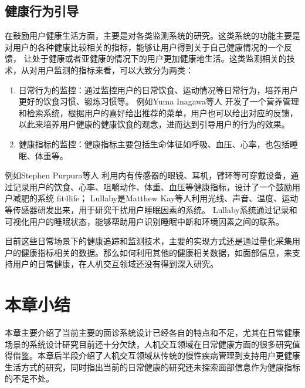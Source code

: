 \subsection{健康行为引导}
在鼓励用户健康生活方面，主要是对各类监测系统的研究。这类系统的功能主要是对用户的各种健康比较相关的指标，能够让用户得到关于自己健康情况的一个反馈，
让处于健康或者亚健康的情况下的用户更加健康地生活。这类监测相关的技术，从对用户监测的指标来看，可以大致分为两类：
\begin{enumerate}

    \item 日常行为的监控：通过监控用户的日常饮食、运动情况等日常行为，培养用户更好的饮食习惯、锻炼习惯等\cite{purpura2011fit4life, Inagawa2013A,bravata2007using,cordeiro2015barriers,lin2006fish, miller2014stepstream}。 例如Yuma Inagawa等人\cite{Inagawa2013A} 开发了一个营养管理和检索系统，根据用户的喜好给出推荐的菜单，用户也可以给出对应的反馈，以此来培养用户健康的健康饮食的观念，进而达到引导用户的行为的效果。

    \item 健康指标的监控：健康指标主要包括生命体征如呼吸、血压、心率，也包括睡眠、体重等\cite{kay2012lullaby, gronvall2013beyond}。
    
\end{enumerate}

例如Stephen Purpura等人\cite{purpura2011fit4life} 利用内有传感器的眼镜、耳机，臂环等可穿戴设备，通过记录用户的饮食、心率、咀嚼动作、体重、血压等健康指标，设计了一个鼓励用户减肥的系统 fit4life； 
Lullaby\cite{kay2012lullaby}是Matthew Kay等人利用光线、声音、温度、运动等传感器研发出来，用于研究干扰用户睡眠因素的系统。
Lullaby系统通过记录和可视化用户的睡眠状态，能够帮助用户识别睡眠中断和环境因素之间的联系。 


目前这些日常场景下的健康追踪和监测技术，主要的实现方式还是通过量化采集用户的健康指标相关的数据。那么如何利用其他的健康相关数据，如面部信息，来支持用户的日常健康，在人机交互领域还没有得到深入研究。



\section{本章小结}
本章主要介绍了当前主要的面诊系统设计已经各自的特点和不足，尤其在日常健康场景的系统设计研究目前还十分欠缺，人机交互领域在日常健康方面的很多研究值得借鉴。本章后半段介绍了人机交互领域从传统的慢性疾病管理到支持用户更健康生活方式的研究，同时指出当前的日常健康的研究还未探索面部信息作为健康指标的不足不处。
